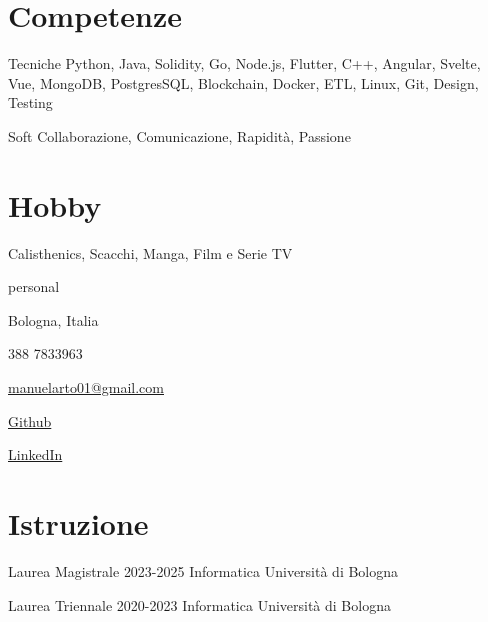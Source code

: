 \documentclass{tccv}
\begin{document}
\section{Competenze}

\begin{factlist}

\item{Tecniche}
     {Python, Java, Solidity, Go, Node.js, Flutter, C++, Angular, Svelte, Vue, MongoDB, PostgresSQL, Blockchain, Docker, ETL, Linux, Git, Design, Testing}

\item{Soft}
     {Collaborazione, Comunicazione, Rapidità, Passione}

\end{factlist}

\section{Hobby}

Calisthenics, Scacchi, Manga, Film e Serie TV

\newpage

\begin{keyvaluelist}{personal}
    \item[\faHome] Bologna, Italia
    \item[\faPhone] 388 7833963
    \item[\faEnvelope] \href{mailto:manuelarto01@gmail.com}{manuelarto01@gmail.com}
    \item[\faGithub] \href{https://github.com/manuelarto}{Github}
    \item[\faLinkedin] \href{https://www.linkedin.com/in/manuel-arto-696012203/}{LinkedIn}
\end{keyvaluelist}

\section{Istruzione}

\begin{yearlist}

\item[Laurea Magistrale]{2023-2025}
     {Informatica}
     {Università di Bologna}

\item[Laurea Triennale]{2020-2023}
    {Informatica}
    {Università di Bologna}

\end{yearlist}
\end{document}
